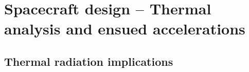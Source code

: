 %
%
%


\section{Spacecraft design -- Thermal analysis and ensued accelerations}
\label{sec:Intro_Thermal}

{\small\textit{\lipsum[1-2]}}

\subsection{Thermal radiation implications}
\label{sec:Intro_ThermalImplications}

{\small\textit{\lipsum[1-2]}}


